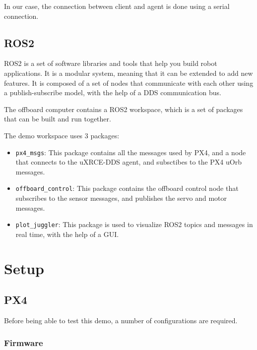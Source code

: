 \documentclass[a4paper]{article}
\begin{document}
In our case, the connection between client and agent is done using a serial connection. 


\subsection{ROS2}

ROS2 is a set of software libraries and tools that help you build robot applications.
It is a modular system, meaning that it can be extended to add new features.
It is composed of a set of nodes that communicate with each other using a publish-subscribe model, with the help of a DDS communication bus.

The offboard computer contains a ROS2 workspace, which is a set of packages that can be built and run together.

The demo workspace uses 3 packages: 
\begin{itemize}
    \item \verb|px4_msgs|: This package contains all the messages used by PX4, and a node that connects to the uXRCE-DDS agent, and subsctibes to the PX4 uOrb messages.
    \item \verb|offboard_control|: This package contains the offboard control node that subscribes to the sensor messages, and publishes the servo and motor messages.
    \item \verb|plot_juggler|: This package is used to visualize ROS2 topics and messages in real time, with the help of a GUI.
\end{itemize}



\section{Setup}

\subsection{PX4}

Before being able to test this demo, a number of configurations are required. 

\subsubsection{Firmware}
\end{document}
